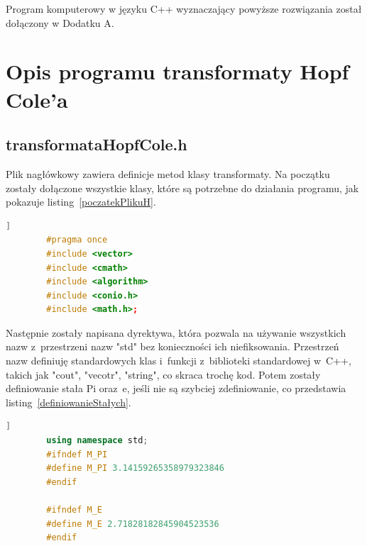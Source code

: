 \documentclass[a4paper,12pt]{article}
\begin{document}
	Program komputerowy w języku C++ wyznaczający powyższe rozwiązania został dołączony w Dodatku A.
	
	\section{Opis programu transformaty Hopf Cole'a}
	\subsection{transformataHopfCole.h}
	Plik nagłówkowy zawiera definicje metod klasy transformaty. Na początku zostały dołączone wszystkie klasy, które są potrzebne do działania programu, jak pokazuje listing~\ref{poczatekPlikuH}.
	\begin{lstlisting}[caption={początek pliku transformataHopfCole.h},label={poczatekPlikuH}, language=C++]]
		#pragma once
		#include <vector>
		#include <cmath>
		#include <algorithm>
		#include <conio.h>
		#include <math.h>;\end{lstlisting}
	Następnie zostały napisana dyrektywa, która pozwala na używanie wszystkich nazw z~przestrzeni nazw "std" bez konieczności ich niefiksowania. Przestrzeń nazw definiuję standardowych klas i~funkcji z~biblioteki standardowej w~C++, takich jak "cout", "vecotr", "string", co skraca trochę kod. Potem zostały definiowanie stała Pi oraz~e, jeśli nie są szybciej zdefiniowanie, co przedstawia listing~\ref{definiowanieStałych}. 
	\begin{lstlisting}[caption={początek pliku definiowanieStałych},label={zdefiniowanie stałych}, language=C++]]
		using namespace std;
		#ifndef M_PI
		#define M_PI 3.14159265358979323846
		#endif
		
		#ifndef M_E
		#define M_E 2.71828182845904523536
		#endif\end{lstlisting}
	
\end{document}
